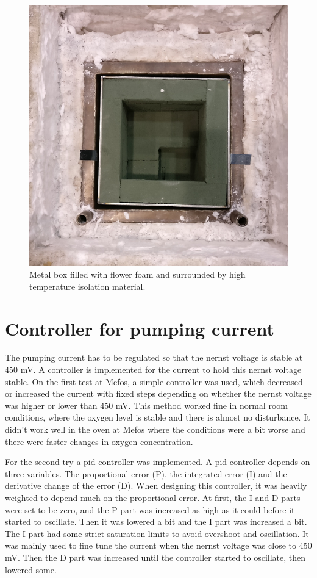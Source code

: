 \begin{figure}
    \centering
    \includegraphics[width=.7\textwidth]{Chapter3/Figures/water_box.png}
    \caption{Metal box filled with flower foam and surrounded by high temperature isolation material.}
    \label{fig:water_box}
\end{figure}


\section{Controller for pumping current}

The pumping current has to be regulated so that the nernst voltage is stable at 450 mV. A controller is implemented for the current to hold this nernst voltage stable. On the first test at Mefos, a simple controller was used, which decreased or increased the current with fixed steps depending on whether the nernst voltage was higher or lower than 450 mV. This method worked fine in normal room conditions, where the oxygen level is stable and there is almost no disturbance. It didn't work well in the oven at Mefos where the conditions were a bit worse and there were faster changes in oxygen concentration.

For the second try a \ac{pid} controller was implemented. A \ac{pid} controller depends on three variables. The proportional error (P), the integrated error (I) and the derivative change of the error (D). When designing this controller, it was heavily weighted to depend much on the proportional error. At first, the I and D parts were set to be zero, and the P part was increased as high as it could before it started to oscillate. Then it was lowered a bit and the I part was increased a bit. The I part had some strict saturation limits to avoid overshoot and oscillation. It was mainly used to fine tune the current when the nernst voltage was close to 450 mV. Then the D part was increased until the controller started to oscillate, then lowered some. 


